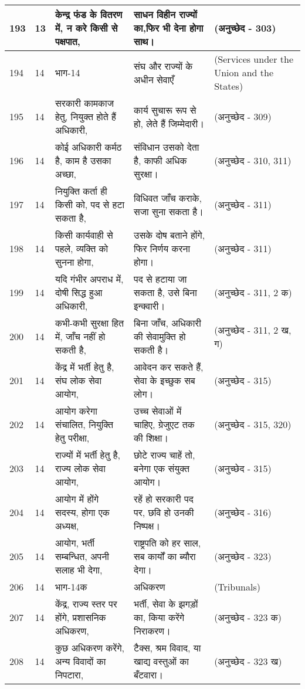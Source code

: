 \begin{longtable}{|l|l|l|l|l|}
193 & 13 & केन्द्र फंड के वितरण में, न करे किसी से पक्षपात, & साधन विहीन राज्यों का,फिर भी देना होगा साथ। & (अनुच्छेद - 303) \\ \hline 
194 & 14 & भाग-14 & संघ और राज्यों के अधीन सेवाएँ & (Services under the Union and the States) \\ \hline 
195 & 14 & सरकारी कामकाज हेतु, नियुक्त होते हैं अधिकारी, & कार्य सुचारू रूप से हो, लेते हैं जिम्मेदारी। & (अनुच्छेद - 309) \\ \hline 
196 & 14 & कोई अधिकारी कर्मठ है, काम है उसका अच्छा, & संविधान उसको देता है, काफी अधिक सुरक्षा। & (अनुच्छेद - 310, 311) \\ \hline 
197 & 14 & नियुक्ति कर्ता ही किसी को, पद से हटा सकता है, & विधिवत जाँच कराके, सजा सुना सकता है। & (अनुच्छेद - 311) \\ \hline 
198 & 14 & किसी कार्यवाही से पहले, व्यक्ति को सुनना होगा, & उसके दोष बताने होंगे, फिर निर्णय करना होगा। & (अनुच्छेद - 311) \\ \hline 
199 & 14 & यदि गंभीर अपराध में, दोषी सिद्ध हुआ अधिकारी, & पद से हटाया जा सकता है, उसे बिना इन्क्वारी। & (अनुच्छेद - 311, 2 क) \\ \hline 
200 & 14 & कभी-कभी सुरक्षा हित में, जाँच नहीं हो सकती है, & बिना जाँच, अधिकारी की सेवामुक्ति हो सकती है। & (अनुच्छेद - 311, 2 ख, ग) \\ \hline 
201 & 14 & केंद्र में भर्ती हेतु है, संघ लोक सेवा आयोग, & आवेदन कर सकते हैं, सेवा के इच्छुक सब लोग। & (अनुच्छेद - 315) \\ \hline 
202 & 14 & आयोग करेगा संचालित, नियुक्ति हेतु परीक्षा, & उच्च सेवाओं में चाहिए, ग्रेजुएट तक की शिक्षा। & (अनुच्छेद - 315, 320) \\ \hline 
203 & 14 & राज्यों में भर्ती हेतु है, राज्य लोक सेवा आयोग, & छोटे राज्य चाहें तो, बनेगा एक संयुक्त आयोग। & (अनुच्छेद - 315) \\ \hline 
204 & 14 & आयोग में होंगे सदस्य, होगा एक अध्यक्ष, & रहें हो सरकारी पद पर, छवि हो उनकी निष्पक्ष। & (अनुच्छेद - 316) \\ \hline 
205 & 14 & आयोग, भर्ती सम्बन्धित, अपनी सलाह भी देगा, & राष्ट्रपति को हर साल, सब कार्यों का ब्यौरा देगा। & (अनुच्छेद - 323) \\ \hline 
206 & 14 & भाग-14क & अधिकरण  & (Tribunals) \\ \hline 
207 & 14 & केंद्र, राज्य स्तर पर होंगे, प्रशासनिक अधिकरण, & भर्ती, सेवा के झगड़ों का, किया करेंगे निराकरण। & (अनुच्छेद - 323 क) \\ \hline 
208 & 14 & कुछ अधिकरण करेंगे, अन्य विवादों का निपटारा, & टैक्स, श्रम विवाद, या खाद्य वस्तुओं का बँटवारा। & (अनुच्छेद - 323 ख) \\ \hline 

\end{longtable}
